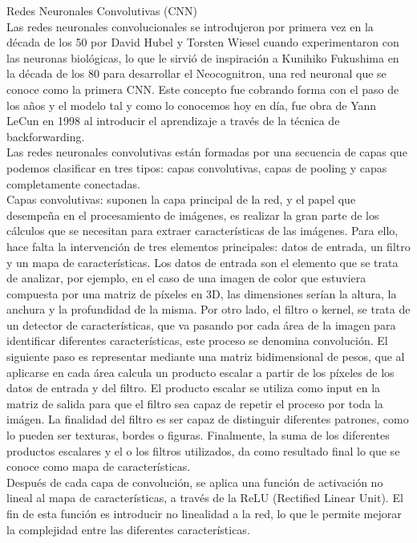 Redes Neuronales Convolutivas (CNN) \\

Las redes neuronales convolucionales se introdujeron por primera vez en la década de los 50 por David Hubel y Torsten Wiesel cuando experimentaron con las neuronas biológicas, lo que le sirvió de inspiración a Kunihiko Fukushima en la década de los 80 para desarrollar el Neocognitron, una red neuronal que se conoce como la primera CNN. Este concepto fue cobrando forma con el paso de los años y el modelo tal y como lo conocemos hoy en día, fue obra de Yann LeCun en 1998 al introducir el aprendizaje a través de la técnica de backforwarding.	\\

Las redes neuronales convolutivas están formadas por una secuencia de capas que podemos clasificar en tres tipos: capas convolutivas, capas de pooling y capas completamente conectadas.\\ 

Capas convolutivas: suponen la capa principal de la red, y el papel que desempeña en el procesamiento de imágenes, es realizar la gran parte de los cálculos que se necesitan para extraer características de las imágenes. Para ello, hace falta la intervención de tres elementos principales: datos de entrada, un filtro y un mapa de características. Los datos de entrada son el elemento que se trata de analizar, por ejemplo, en el caso de una imagen de color que estuviera compuesta por una matriz de píxeles en 3D, las dimensiones serían la altura, la anchura y la profundidad de la misma. Por otro lado, el filtro o kernel, se trata de un detector de características, que va pasando por cada área de la imagen para identificar diferentes características, este proceso se denomina convolución. El siguiente paso es representar mediante una matriz bidimensional de pesos, que al aplicarse en cada área calcula un producto escalar a partir de los píxeles de los datos de entrada y del filtro. El producto escalar se utiliza como input en la matriz de salida para que el filtro sea capaz de repetir el proceso por toda la imágen. La finalidad del filtro es ser capaz de distinguir diferentes patrones, como lo pueden ser texturas, bordes o figuras. Finalmente, la suma de los diferentes productos escalares y el o los filtros utilizados, da como resultado final lo que se conoce como mapa de características. \\

Después de cada capa de convolución, se aplica una función de activación no lineal al mapa de características, a través de la ReLU (Rectified Linear Unit). El fin de esta función es introducir no linealidad a la red, lo que le permite mejorar la complejidad entre las diferentes características. \\

